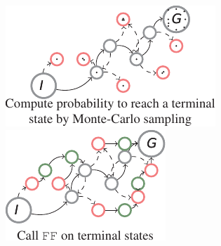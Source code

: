 \documentclass{beamer}
\begin{document}
\begin{frame}
\begin{columns}
     {\includegraphics[width=\textwidth]{images/rff-5.pdf}}
     {\includegraphics[width=\textwidth]{images/rff-6.pdf}}



\end{columns}
\end{frame}
\end{document}
